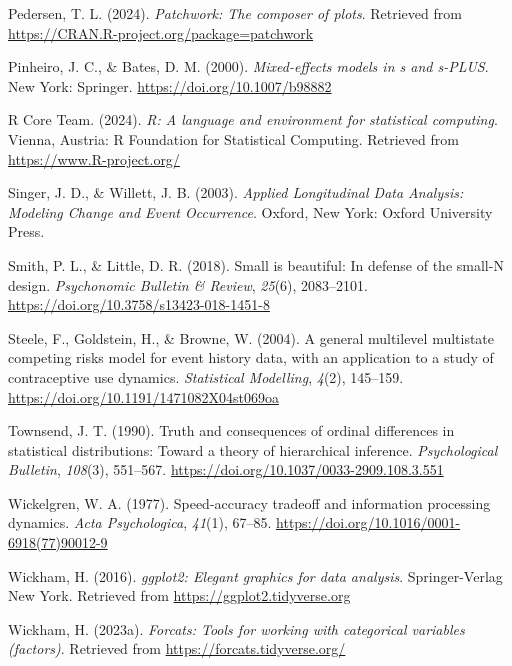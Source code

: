 \documentclass[
  man,floatsintext]{apa6}
\newlength{\cslhangindent}
\newenvironment{CSLReferences}[2] %
 {\begin{list}{}{%
  \setlength{\itemindent}{0pt}
  \setlength{\leftmargin}{0pt}
  \setlength{\parsep}{0pt}
  \ifodd #1
   \setlength{\leftmargin}{\cslhangindent}
   \setlength{\itemindent}{-1\cslhangindent}
  \fi
  \setlength{\itemsep}{#2\baselineskip}}}
 {\end{list}}
\begin{document}
\begin{CSLReferences}{1}{0}
Pedersen, T. L. (2024). \emph{Patchwork: The composer of plots}. Retrieved from \url{https://CRAN.R-project.org/package=patchwork}

Pinheiro, J. C., \& Bates, D. M. (2000). \emph{Mixed-effects models in s and s-PLUS}. New York: Springer. \url{https://doi.org/10.1007/b98882}

R Core Team. (2024). \emph{R: A language and environment for statistical computing}. Vienna, Austria: R Foundation for Statistical Computing. Retrieved from \url{https://www.R-project.org/}

Singer, J. D., \& Willett, J. B. (2003). \emph{Applied {Longitudinal Data Analysis}: {Modeling Change} and {Event Occurrence}}. Oxford, New York: Oxford University Press.

Smith, P. L., \& Little, D. R. (2018). Small is beautiful: {In} defense of the small-{N} design. \emph{Psychonomic Bulletin \& Review}, \emph{25}(6), 2083--2101. \url{https://doi.org/10.3758/s13423-018-1451-8}

Steele, F., Goldstein, H., \& Browne, W. (2004). A general multilevel multistate competing risks model for event history data, with an application to a study of contraceptive use dynamics. \emph{Statistical Modelling}, \emph{4}(2), 145--159. \url{https://doi.org/10.1191/1471082X04st069oa}

Townsend, J. T. (1990). Truth and consequences of ordinal differences in statistical distributions: {Toward} a theory of hierarchical inference. \emph{Psychological Bulletin}, \emph{108}(3), 551--567. \url{https://doi.org/10.1037/0033-2909.108.3.551}

Wickelgren, W. A. (1977). Speed-accuracy tradeoff and information processing dynamics. \emph{Acta Psychologica}, \emph{41}(1), 67--85. \url{https://doi.org/10.1016/0001-6918(77)90012-9}

Wickham, H. (2016). \emph{ggplot2: Elegant graphics for data analysis}. Springer-Verlag New York. Retrieved from \url{https://ggplot2.tidyverse.org}

Wickham, H. (2023a). \emph{Forcats: Tools for working with categorical variables (factors)}. Retrieved from \url{https://forcats.tidyverse.org/}


\end{CSLReferences}
\end{document}
